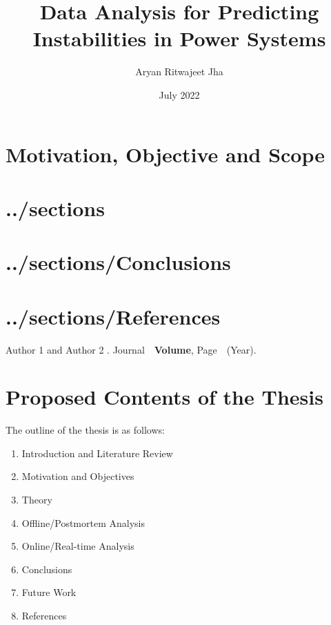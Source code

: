\documentclass[MS,synopsis]{iitddiss}
\title{Data Analysis for Predicting Instabilities in Power Systems}
\author{Aryan Ritwajeet Jha}
\date{July 2022}
\begin{document}
\maketitle



\setcounter{page}{0}


\section{Motivation, Objective and Scope}

\section{../sections}

\section{../sections/Conclusions}

\section{../sections/References}


\begin{singlespace}
\begin{thebibliography}{10}

Author 1 and Author 2
.
\newblock Journal\ \ {\bf Volume}, Page\ \ (Year).
\end{thebibliography}

\end{singlespace}

\section{Proposed Contents of the Thesis}
The outline of the thesis is as follows:
\begin{enumerate}
\item Introduction and Literature Review
\item Motivation and Objectives
\item Theory
\item Offline/Postmortem Analysis
\item Online/Real-time Analysis
\item Conclusions
\item Future Work
\item References
\end{enumerate}
\end{document}
